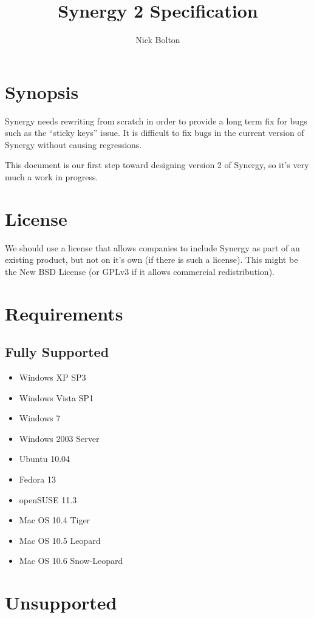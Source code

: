 \documentclass{article}
\title{Synergy 2 Specification}
\author{Nick Bolton}
\begin{document}
\maketitle

\section{Synopsis}

Synergy needs rewriting from scratch in order to provide a long term fix for 
bugs such as the ``sticky keys'' issue. It is difficult to fix bugs in the
current version of Synergy without causing regressions.

This document is our first step toward designing version 2 of Synergy, so it's
very much a work in progress.

\section{License}

We should use a license that allows companies to include Synergy as part of an 
existing product, but not on it's own (if there is such a license). This might
be the New BSD License (or GPLv3 if it allows commercial redistribution).

\section{Requirements}

\subsection{Fully Supported}

\begin{itemize}
  \item Windows XP SP3
  \item Windows Vista SP1
  \item Windows 7
  \item Windows 2003 Server
  \item Ubuntu 10.04
  \item Fedora 13
  \item openSUSE 11.3
  \item Mac OS 10.4 Tiger
  \item Mac OS 10.5 Leopard
  \item Mac OS 10.6 Snow-Leopard
\end{itemize}

\section{Unsupported}
\end{document}
